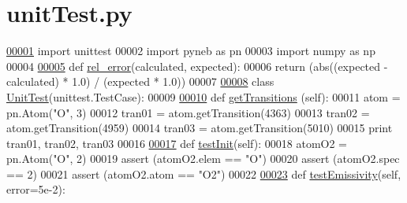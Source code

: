 \hypertarget{unit_test_8py_source}{}\section{unit\+Test.\+py}
\label{unit_test_8py_source}

\begin{DoxyCode}
\hypertarget{unit_test_8py_source_l00001}{}\hyperlink{namespacepyneb_1_1test_1_1unit_test}{00001} \textcolor{keyword}{import} unittest
00002 \textcolor{keyword}{import} pyneb \textcolor{keyword}{as} pn
00003 \textcolor{keyword}{import} numpy \textcolor{keyword}{as} np
00004 
\hypertarget{unit_test_8py_source_l00005}{}\hyperlink{namespacepyneb_1_1test_1_1unit_test_aff3b7f847905c444d8b10727f10de236}{00005} \textcolor{keyword}{def }\hyperlink{namespacepyneb_1_1test_1_1unit_test_aff3b7f847905c444d8b10727f10de236}{rel\_error}(calculated, expected):
00006         \textcolor{keywordflow}{return} (abs((expected - calculated) * 1.0) / (expected * 1.0))
00007 
\hypertarget{unit_test_8py_source_l00008}{}\hyperlink{classpyneb_1_1test_1_1unit_test_1_1_unit_test}{00008} \textcolor{keyword}{class }\hyperlink{classpyneb_1_1test_1_1unit_test_1_1_unit_test}{UnitTest}(unittest.TestCase):
00009 
\hypertarget{unit_test_8py_source_l00010}{}\hyperlink{classpyneb_1_1test_1_1unit_test_1_1_unit_test_a6738a3f807de969e8ce8ad1045c4c5a7}{00010}         \textcolor{keyword}{def }\hyperlink{classpyneb_1_1test_1_1unit_test_1_1_unit_test_a6738a3f807de969e8ce8ad1045c4c5a7}{getTransitions} (self):
00011                 atom = pn.Atom(\textcolor{stringliteral}{"O"}, 3)
00012                 tran01 = atom.getTransition(4363)
00013                 tran02 = atom.getTransition(4959)
00014                 tran03 = atom.getTransition(5010)
00015                 \textcolor{keywordflow}{print} tran01, tran02, tran03
00016 
\hypertarget{unit_test_8py_source_l00017}{}\hyperlink{classpyneb_1_1test_1_1unit_test_1_1_unit_test_ab885c3d8c3f2282d4ec88f1ce96f252c}{00017}         \textcolor{keyword}{def }\hyperlink{classpyneb_1_1test_1_1unit_test_1_1_unit_test_ab885c3d8c3f2282d4ec88f1ce96f252c}{testInit}(self):
00018                 atomO2 = pn.Atom(\textcolor{stringliteral}{"O"}, 2)
00019                 \textcolor{keyword}{assert} (atomO2.elem == \textcolor{stringliteral}{"O"})
00020                 \textcolor{keyword}{assert} (atomO2.spec == 2)
00021                 \textcolor{keyword}{assert} (atomO2.atom == \textcolor{stringliteral}{"O2"})
00022 
\hypertarget{unit_test_8py_source_l00023}{}\hyperlink{classpyneb_1_1test_1_1unit_test_1_1_unit_test_aaf8316a5619d701aaae56fdd26dd167b}{00023}         \textcolor{keyword}{def }\hyperlink{classpyneb_1_1test_1_1unit_test_1_1_unit_test_aaf8316a5619d701aaae56fdd26dd167b}{testEmissivity}(self, error=5e-2):

\end{DoxyCode}
